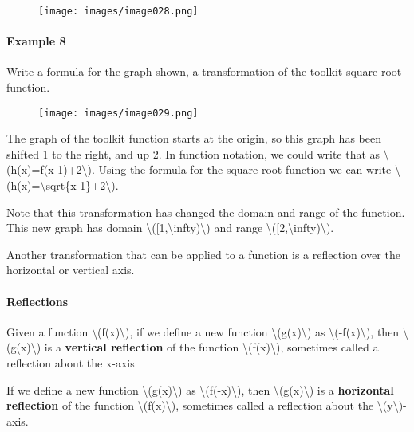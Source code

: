 \begin{figure}
\centering
\texttt{[image: images/image028.png]}
\caption{}
\end{figure}

\hypertarget{example-8}{%
\paragraph{Example 8}\label{example-8}}

Write a formula for the graph shown, a transformation of the toolkit
square root function.

\begin{figure}
\centering
\texttt{[image: images/image029.png]}
\caption{}
\end{figure}

The graph of the toolkit function starts at the origin, so this graph
has been shifted 1 to the right, and up 2. In function notation, we
could write that as \textbackslash{}(h(x)=f(x-1)+2\textbackslash{}).
Using the formula for the square root function we can write
\textbackslash{}(h(x)=\textbackslash{}sqrt\{x-1\}+2\textbackslash{}).

Note that this transformation has changed the domain and range of the
function. This new graph has domain
\textbackslash{}({[}1,\textbackslash{}infty)\textbackslash{}) and range
\textbackslash{}({[}2,\textbackslash{}infty)\textbackslash{}).

Another transformation that can be applied to a function is a reflection
over the horizontal or vertical axis.

\hypertarget{reflections}{%
\paragraph{Reflections}\label{reflections}}

Given a function \textbackslash{}(f(x)\textbackslash{}), if we define a
new function \textbackslash{}(g(x)\textbackslash{}) as
\textbackslash{}(-f(x)\textbackslash{}), then
\textbackslash{}(g(x)\textbackslash{}) is a \textbf{vertical reflection}
of the function \textbackslash{}(f(x)\textbackslash{}), sometimes called
a reflection about the x-axis

If we define a new function \textbackslash{}(g(x)\textbackslash{}) as
\textbackslash{}(f(-x)\textbackslash{}), then
\textbackslash{}(g(x)\textbackslash{}) is a \textbf{horizontal
reflection} of the function \textbackslash{}(f(x)\textbackslash{}),
sometimes called a reflection about the
\textbackslash{}(y\textbackslash{})-axis.

